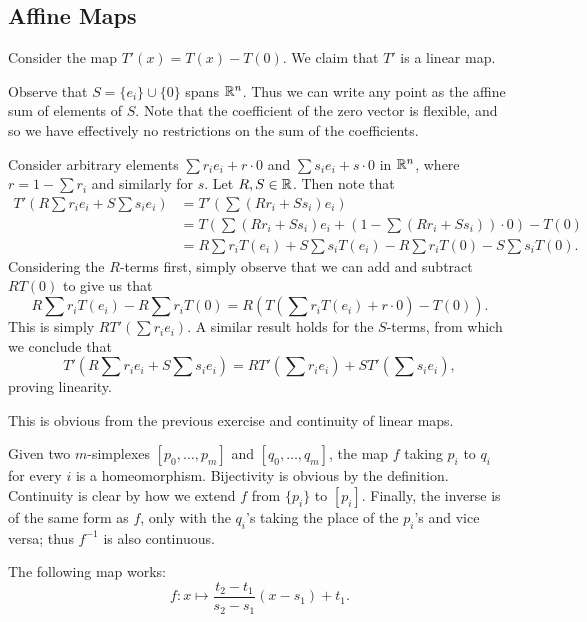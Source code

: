\documentclass[../../solutions.tex]{subfiles}
\begin{document}
\subsection{Affine Maps}
\begin{exercise} \leavevmode
Consider the map $T'(x)=T(x)-T(0)$. We claim that $T'$ is a linear map. 

Observe that $S=\{e_i\}\cup\{0\}$ spans $\mathbb{R}^n$. Thus we can write any point as the affine sum of elements of $S$. Note that the coefficient of the zero vector is flexible, and so we have effectively no restrictions on the sum of the coefficients. 

Consider arbitrary elements $\sum r_ie_i+r\cdot0$ and $\sum s_ie_i+s\cdot0$ in $\mathbb{R}^n$, where $r=1-\sum r_i$ and similarly for $s$. Let $R,S\in\mathbb{R}$. Then note that \begin{align*}T'\left(R\sum r_ie_i+S\sum s_ie_i\right)&=T'\left(\sum(Rr_i+Ss_i)e_i\right)\\&= T\left(\sum(Rr_i+Ss_i)e_i+\left(1-\sum(Rr_i+Ss_i)\right)\cdot0\right)-T(0)\\&=R\sum r_iT(e_i)+S\sum s_iT(e_i)-R\sum r_iT(0)-S\sum s_iT(0).\end{align*} Considering the $R$-terms first, simply observe that we can add and subtract $RT(0)$ to give us that \[R\sum r_iT(e_i)-R\sum r_iT(0)=R\left(T\left(\sum r_i T(e_i)+r\cdot0\right)-T(0)\right).\] This is simply $RT'\left(\sum r_ie_i\right)$. A similar result holds for the $S$-terms, from which we conclude that \[T'\left(R\sum r_ie_i+S\sum s_ie_i\right)=RT'\left(\sum r_ie_i\right)+ST'\left(\sum s_ie_i\right),\] proving linearity. 
\end{exercise} 

\begin{exercise} \leavevmode
This is obvious from the previous exercise and continuity of linear maps. 
\end{exercise} 

\begin{exercise} \leavevmode
Given two $m$-simplexes $[p_0,\dots,p_m]$ and $[q_0,\dots,q_m]$, the map $f$ taking $p_i$ to $q_i$ for every $i$ is a homeomorphism. Bijectivity is obvious by the definition. Continuity is clear by how we extend $f$ from $\{p_i\}$ to $[p_i]$. Finally, the inverse is of the same form as $f$, only with the $q_i$'s taking the place of the $p_i$'s and vice versa; thus $f^{-1}$ is also continuous. 
\end{exercise} 

\begin{exercise} \leavevmode
The following map works: \[f:x\mapsto\frac{t_2-t_1}{s_2-s_1}(x-s_1)+t_1.\] 
\end{exercise} 
\end{document}
